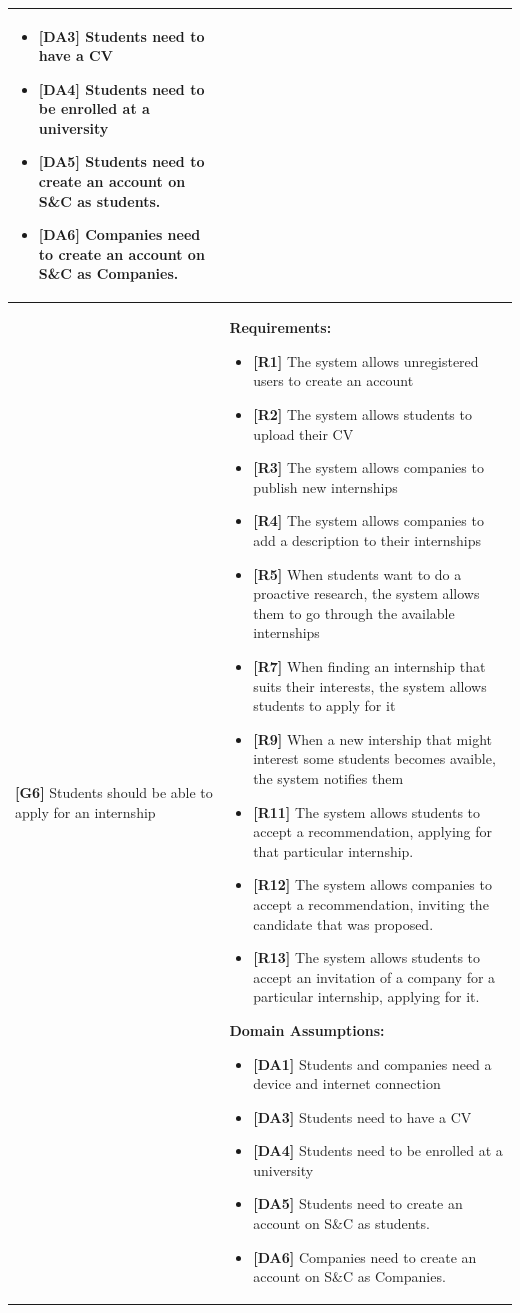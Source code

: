 \begin{longtable}{|p{}|p{}|}
\begin{itemize}
     \item \textbf{[DA3]} Students need to have a CV
     \item \textbf{[DA4]} Students need to be enrolled at a university
    \item \textbf{[DA5]} Students need to create an account on S\&C as students.
    \item \textbf{[DA6]} Companies need to create an account on S\&C as Companies.
\end{itemize} \\
\hline
\hline
\textbf{[G6]}  Students should be able to apply for an internship
& 
\textbf{Requirements:}
\begin{itemize}
    \item \textbf{[R1]} The system allows unregistered users to create an account
    \item \textbf{[R2]} The system allows students to upload their CV
    \item \textbf{[R3]} The system allows companies to publish new internships
    \item \textbf{[R4]} The system allows companies to add a description to their internships
    \item \textbf{[R5]} When students want to do a proactive research, the system allows them to go through the available internships
    \item \textbf{[R7]} When finding an internship that suits their interests, the system allows students to apply for it
    \item  \textbf{[R9]} When a new intership that might interest some students becomes avaible, the system notifies them
    \item  \textbf{[R11]} The system allows students to accept a recommendation, applying for that particular internship.
    \item  \textbf{[R12]} The system allows companies to accept a recommendation, inviting the candidate that was proposed.
    \item \textbf{[R13]} The system allows students to accept an invitation of a company for a particular internship, applying for it.
\end{itemize}
\textbf{Domain Assumptions:}
\begin{itemize}
     \item \textbf{[DA1]} Students and companies need a device and internet connection
     \item \textbf{[DA3]} Students need to have a CV
     \item \textbf{[DA4]} Students need to be enrolled at a university
    \item \textbf{[DA5]} Students need to create an account on S\&C as students.
    \item \textbf{[DA6]} Companies need to create an account on S\&C as Companies.
\end{itemize} \\
\hline


\end{longtable}
